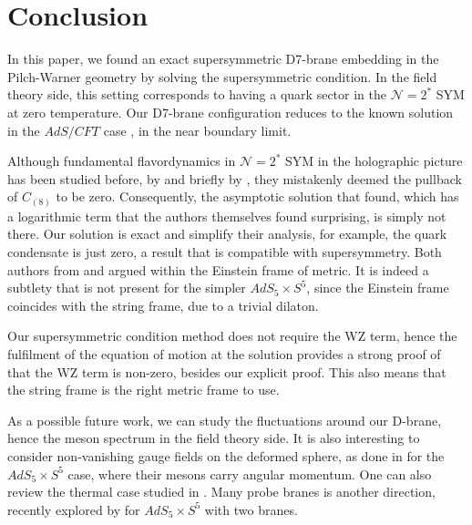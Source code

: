 \section{Conclusion}

In this paper, we found an exact supersymmetric D7-brane embedding in the Pilch-Warner geometry by solving the supersymmetric condition. In the field theory side, this setting corresponds to having a quark sector in the $\mathcal{N}=2^*$ SYM at zero temperature. Our D7-brane configuration reduces to the known solution in the $AdS/CFT$ case \cite{Karch:2005ms}, in the near boundary limit. 

Although fundamental flavordynamics in $\mathcal{N}=2^*$ SYM in the holographic picture has been studied before, by \cite{Albash:2011nw} and briefly by \cite{Evans:2005ti}, they mistakenly deemed the pullback of $C_{(8)}$ to be zero. Consequently, the asymptotic solution that \cite{Albash:2011nw} found, which has a logarithmic term that the authors themselves found surprising, is simply not there. Our solution is exact and simplify their analysis, for example, the quark condensate is just zero, a result that is compatible with supersymmetry. Both authors from \cite{Albash:2011nw} and \cite{Evans:2005ti} argued within the Einstein frame of metric. It is indeed a subtlety that is not present for the simpler $AdS_5 \times S^5$, since the Einstein frame coincides with the string frame, due to a trivial dilaton. 

Our supersymmetric condition method does not require the WZ term, hence the fulfilment of the equation of motion at the solution provides a strong proof of that the WZ term is non-zero, besides our explicit proof. This also means that the string frame is the right metric frame to use. 

As a possible future work, we can study the fluctuations around our D-brane, hence the meson spectrum in the field theory side. 
It is also interesting to consider non-vanishing gauge fields on the deformed sphere, as done in \cite{Kruczenski:2003be} for the $AdS_5 \times S^5$ case, where their mesons carry angular momentum. One can also review the thermal case studied in \cite{Albash:2011dq}. Many probe branes is another direction, recently explored by \cite{Faedo:2019jlp} for $AdS_5 \times S^5$ with two branes.


